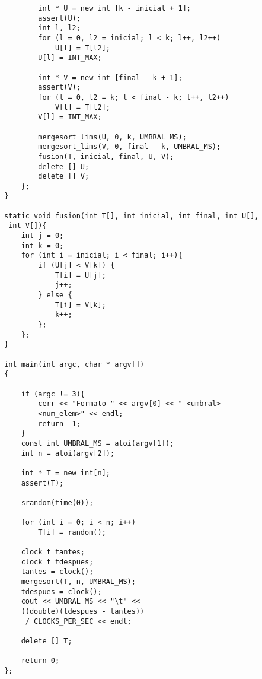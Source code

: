 \documentclass[12pt,spanish]{article}
\begin{document}
\begin{verbatim}
		int * U = new int [k - inicial + 1];
		assert(U);
		int l, l2;
		for (l = 0, l2 = inicial; l < k; l++, l2++)
			U[l] = T[l2];
		U[l] = INT_MAX;

		int * V = new int [final - k + 1];
		assert(V);
		for (l = 0, l2 = k; l < final - k; l++, l2++)
			V[l] = T[l2];
		V[l] = INT_MAX;

		mergesort_lims(U, 0, k, UMBRAL_MS);
		mergesort_lims(V, 0, final - k, UMBRAL_MS);
		fusion(T, inicial, final, U, V);
		delete [] U;
		delete [] V;
	};
}

static void fusion(int T[], int inicial, int final, int U[],
 int V[]){
	int j = 0;
	int k = 0;
	for (int i = inicial; i < final; i++){
		if (U[j] < V[k]) {
			T[i] = U[j];
			j++;
		} else {
			T[i] = V[k];
			k++;
		};
	};
}

int main(int argc, char * argv[])
{

	if (argc != 3){
		cerr << "Formato " << argv[0] << " <umbral> 
		<num_elem>" << endl;
		return -1;
	}
	const int UMBRAL_MS = atoi(argv[1]);
	int n = atoi(argv[2]);

	int * T = new int[n];
	assert(T);

	srandom(time(0));

	for (int i = 0; i < n; i++)
		T[i] = random();
	
	clock_t tantes;    
	clock_t tdespues; 
	tantes = clock();
	mergesort(T, n, UMBRAL_MS);
	tdespues = clock();
	cout << UMBRAL_MS << "\t" << 
	((double)(tdespues - tantes))
	 / CLOCKS_PER_SEC << endl;

	delete [] T;

	return 0;
};

\end{verbatim}
\end{document}
